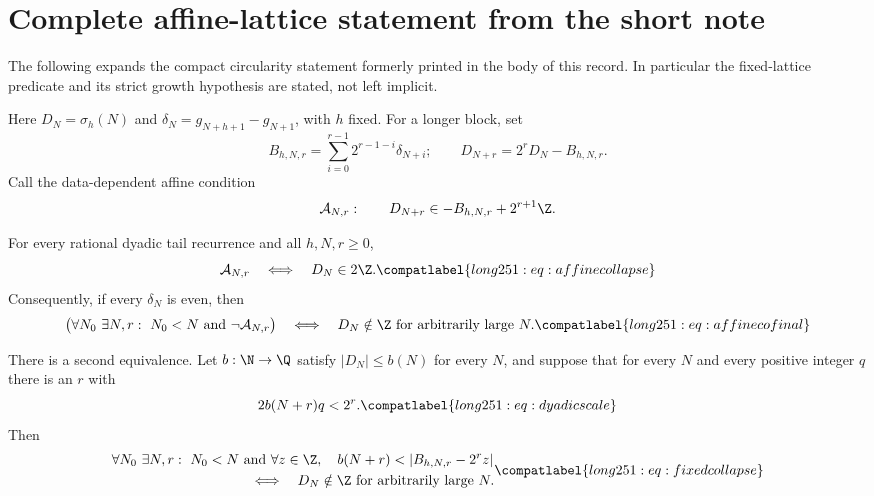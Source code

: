 \clearpage
\section{Complete affine-lattice statement from the short note}
\label{long251:app:affine-detail}
The following expands the compact circularity statement formerly printed
in the body of this record.  In particular the fixed-lattice predicate
and its strict growth hypothesis are stated, not left implicit.

Here $D_N=\sigma_h(N)$ and
$\delta_N=g_{N+h+1}-g_{N+1}$, with $h$ fixed.  For a longer block, set
\[
 B_{h,N,r}=\sum_{i=0}^{r-1}2^{r-1-i}\delta_{N+i};
 \qquad D_{N+r}=2^rD_N-B_{h,N,r}.
\]
Call the data-dependent affine condition
\[
 \mathcal A_{N,r}:\qquad
 D_{N+r}\in -B_{h,N,r}+2^{r+1}\Z.
\]

\begin{theorem}\label{long251:res:affinecollapse}
For every rational dyadic tail recurrence and all $h,N,r\ge0$,
\begin{equation}
 \mathcal A_{N,r}\quad\Longleftrightarrow\quad D_N\in2\Z.
\label{eq:affinecollapse}\compatlabel{long251:eq:affinecollapse}
\end{equation}
Consequently, if every $\delta_N$ is even, then
\begin{equation}
 \bigl(\forall N_0\ \exists N,r:\ N_0<N\text{ and }\neg\mathcal A_{N,r}\bigr)
 \quad\Longleftrightarrow\quad
 D_N\notin\Z\text{ for arbitrarily large }N.
\label{eq:affinecofinal}\compatlabel{long251:eq:affinecofinal}
\end{equation}

There is a second equivalence.  Let $b:\N\to\Q$ satisfy
$|D_N|\le b(N)$ for every $N$, and suppose that for every $N$ and every
positive integer $q$ there is an $r$ with
\begin{equation}
 2b(N+r)q<2^r.
\label{eq:dyadicscale}\compatlabel{long251:eq:dyadicscale}
\end{equation}
Then
\begin{equation}
 \begin{split}
 &\forall N_0\ \exists N,r:\ N_0<N\text{ and }
   \forall z\in\Z,\quad
   b(N+r)<|B_{h,N,r}-2^rz|\\
 &\hspace{35mm}\Longleftrightarrow\quad
 D_N\notin\Z\text{ for arbitrarily large }N.
 \end{split}
\label{eq:fixedcollapse}\compatlabel{long251:eq:fixedcollapse}
\end{equation}
\end{theorem}

